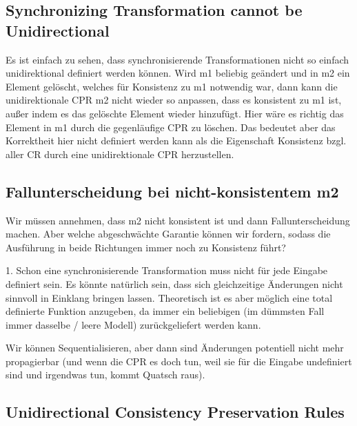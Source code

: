 \subsection{Synchronizing Transformation cannot be Unidirectional}
Es ist einfach zu sehen, dass synchronisierende Transformationen nicht so einfach unidirektional definiert werden können.
Wird m1 beliebig geändert und in m2 ein Element gelöscht, welches für Konsistenz zu m1 notwendig war, dann kann die unidirektionale CPR m2 nicht wieder so anpassen, dass es konsistent zu m1 ist, außer indem es das gelöschte Element wieder hinzufügt. Hier wäre es richtig das Element in m1 durch die gegenläufige CPR zu löschen. 
Das bedeutet aber das Korrektheit hier nicht definiert werden kann als die Eigenschaft Konsistenz bzgl. aller CR durch eine unidirektionale CPR herzustellen.




\subsection{Fallunterscheidung bei nicht-konsistentem m2}
Wir müssen annehmen, dass m2 nicht konsistent ist und dann Fallunterscheidung machen. Aber welche abgeschwächte Garantie können wir fordern, sodass die Ausführung in beide Richtungen immer noch zu Konsistenz führt?




1. Schon eine synchronisierende Transformation muss nicht für jede Eingabe definiert sein. Es könnte natürlich sein, dass sich gleichzeitige Änderungen nicht sinnvoll in Einklang bringen lassen. Theoretisch ist es aber möglich eine total definierte Funktion anzugeben, da immer ein beliebigen (im dümmsten Fall immer dasselbe / leere Modell) zurückgeliefert werden kann.







Wir können Sequentialisieren, aber dann sind Änderungen potentiell nicht mehr propagierbar (und wenn die CPR es doch tun, weil sie für die Eingabe undefiniert sind und irgendwas tun, kommt Quatsch raus).





\subsection{Unidirectional Consistency Preservation Rules}

